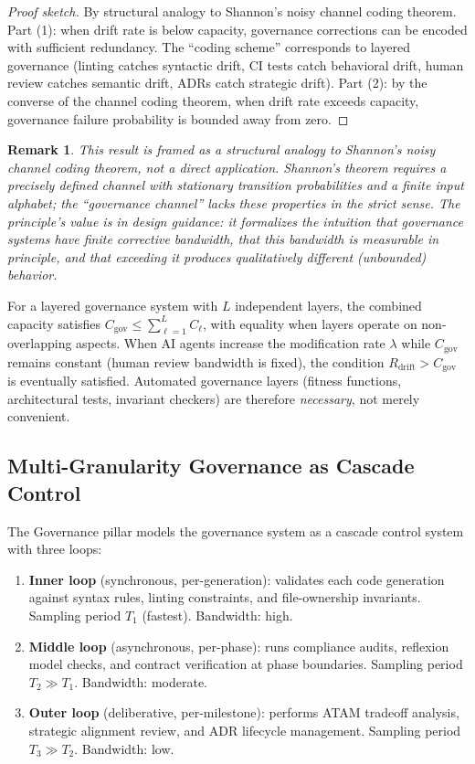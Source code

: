\documentclass[11pt, a4paper, logo, copyright]{googledeepmind}
\newtheorem*{remark}{Remark}
\begin{document}
\begin{proof}[Proof sketch]
By structural analogy to Shannon's noisy channel coding theorem. Part (1): when drift rate is below capacity, governance corrections can be encoded with sufficient redundancy. The ``coding scheme'' corresponds to layered governance (linting catches syntactic drift, CI tests catch behavioral drift, human review catches semantic drift, ADRs catch strategic drift). Part (2): by the converse of the channel coding theorem, when drift rate exceeds capacity, governance failure probability is bounded away from zero.
\end{proof}

\begin{remark}
This result is framed as a \emph{structural analogy} to Shannon's noisy channel coding theorem, not a direct application. Shannon's theorem requires a precisely defined channel with stationary transition probabilities and a finite input alphabet; the ``governance channel'' lacks these properties in the strict sense. The principle's value is in design guidance: it formalizes the intuition that governance systems have finite corrective bandwidth, that this bandwidth is measurable in principle, and that exceeding it produces qualitatively different (unbounded) behavior.
\end{remark}

For a layered governance system with $L$ independent layers, the combined capacity satisfies $C_{\text{gov}} \leq \sum_{\ell=1}^{L} C_\ell$, with equality when layers operate on non-overlapping aspects. When AI agents increase the modification rate $\lambda$ while $C_{\text{gov}}$ remains constant (human review bandwidth is fixed), the condition $R_{\text{drift}} > C_{\text{gov}}$ is eventually satisfied. Automated governance layers (fitness functions, architectural tests, invariant checkers) are therefore \emph{necessary}, not merely convenient.

\subsection{Multi-Granularity Governance as Cascade Control}

The Governance pillar models the governance system as a cascade control system with three loops:

\begin{enumerate}
    \item \textbf{Inner loop} (synchronous, per-generation): validates each code generation against syntax rules, linting constraints, and file-ownership invariants. Sampling period $T_1$ (fastest). Bandwidth: high.
    \item \textbf{Middle loop} (asynchronous, per-phase): runs compliance audits, reflexion model checks, and contract verification at phase boundaries. Sampling period $T_2 \gg T_1$. Bandwidth: moderate.
    \item \textbf{Outer loop} (deliberative, per-milestone): performs ATAM tradeoff analysis, strategic alignment review, and ADR lifecycle management. Sampling period $T_3 \gg T_2$. Bandwidth: low.
\end{enumerate}
\end{document}
